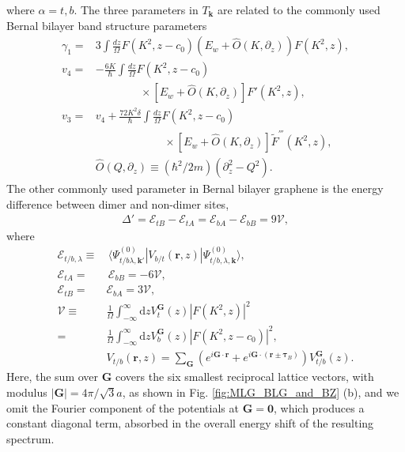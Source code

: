 \documentclass[showpacs,aps,prb,reprint,twocolumn]{revtex4-1}
\begin{document}
where $\alpha=t,b$. The three parameters in $T_{\boldsymbol{k}}$ are related to the commonly used Bernal bilayer band structure parameters
\begin{subequations}\label{eq:BLG_paremeters}
\begin{align}
\gamma_1 =&
3\int\frac{dz}{\Omega} F(K^2,z-c_0) \left(E_w + \hat{O}(K,\partial_z)\right) F(K^2,z), \\
v_4 =&-\frac{6K}{\hbar} \int \frac{dz}{\Omega} F(K^2,z-c_0) \\
&\qquad\qquad\times\left[E_w + \hat{O}(K,\partial_z)\right] F'(K^2,z), \nonumber\\
v_3 =& v_4+\frac{72K^2 \delta}{\hbar} \int \frac{dz}{\Omega} F(K^2,z-c_0) \\
&\qquad\qquad\qquad\,\times\left[E_w + \hat{O}(K,\partial_z)\right] \tilde{F}^{'''}(K^2,z),\nonumber\\
&\hat{O}(Q,\partial_z) \equiv (\hbar^2/2m) \left(\partial^2_z - Q^2\right).\nonumber
\end{align}
\end{subequations}
The other commonly used parameter in Bernal bilayer graphene is the energy difference between dimer and non-dimer sites,
\begin{align}\label{eq:DeltaPrime}
\Delta'=\mathcal{E}_{tB}-\mathcal{E}_{tA}=\mathcal{E}_{bA}-\mathcal{E}_{bB}=9\mathcal{V},
\end{align}
where
\begin{align}\label{eq:Onsite_Energies}
\mathcal{E}_{t/b,\lambda}\equiv&\,
\langle\Psi_{t/b\lambda,\boldsymbol{k}'}^{(0)}|
V_{b/t}(\boldsymbol{r},z)
|\Psi_{t/b,\lambda,\boldsymbol{k}}^{(0)}\rangle,\\
\mathcal{E}_{tA}=&\,\mathcal{E}_{bB}=
-6\mathcal{V},\nonumber\\
\mathcal{E}_{tB}=&\mathcal{E}_{bA}=
3\mathcal{V},\nonumber\\
\mathcal{V}\equiv&
\frac{1}{\Omega}
\int_{-\infty}^{\infty}
\mathrm{d}zV_t^{\boldsymbol{G}}(z)
|F(K^2,z)|^2\nonumber\\
=&
\frac{1}{\Omega}
\int_{-\infty}^{\infty}
\mathrm{d}zV_b^{\boldsymbol{G}}(z)
|F(K^2,z-c_0)|^2,\nonumber\\
&V_{t/b}(\boldsymbol{r},z)=
\sum_{\boldsymbol{G}}
\left(
e^{i\boldsymbol{G}\cdot \boldsymbol{r}}+
e^{i\boldsymbol{G}\cdot (\boldsymbol{r}\pm\boldsymbol{\tau}_B)}
\right)
V_{t/b}^{\boldsymbol{G}}(z)\nonumber.
\end{align}
Here, the sum over $\boldsymbol{G}$ covers the six smallest reciprocal lattice vectors, with modulus $|\boldsymbol{G}|=4\pi/\sqrt{3}a$, as shown in Fig. \ref{fig:MLG_BLG_and_BZ} (b), and we omit the Fourier component of the potentials at $\boldsymbol{G}=\boldsymbol{0}$, which produces a constant diagonal term, absorbed in the overall energy shift of the resulting spectrum.
\end{document}
